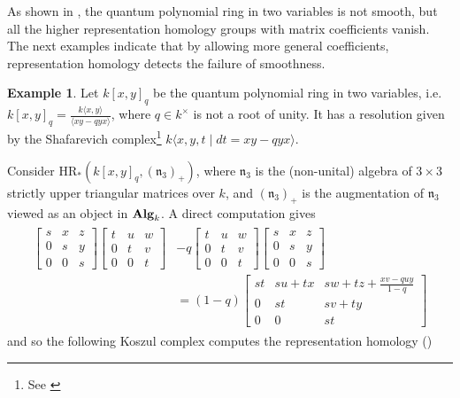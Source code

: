 \documentclass{article}
\numberwithin{equation}{section} %
\theoremstyle{plain}
\theoremstyle{definition}
\newtheorem{example}[theorem]{Example}
\theoremstyle{remark}
\begin{document}
As shown in \cite[Section 6.2.2]{BFR14}, the quantum polynomial ring in two variables is not smooth, but all the higher representation homology groups with matrix coefficients vanish.
The next examples indicate that by allowing more general coefficients, representation homology detects the failure of smoothness.

\begin{example}\label{Example_QuantumPlane}
Let $k[x,y]_q$ be the quantum polynomial ring in two variables, i.e. $\displaystyle k[x,y]_q=\frac{k\langle x,y\rangle}{\langle xy-qyx\rangle}$,
where $q\in k^\times$ is not a root of unity.
It has a resolution given by the Shafarevich complex\footnote{See \cite{P05}} $k\langle x,y,t\mid dt=xy-qyx\rangle$.

Consider $\mathrm{HR}_*(k[x,y]_q,(\mathfrak{n}_3)_+)$, where $\mathfrak{n}_3$ is the (non-unital) algebra of $3\times3$ strictly upper triangular matrices over $k$, and $(\mathfrak{n}_3)_+$ is the augmentation of $\mathfrak{n}_3$ viewed as an object in ${\bf Alg}_k$.
A direct computation gives
\begin{align*}
\begin{split}
\begin{bmatrix}s&x&z\\ 0&s&y\\ 0&0&s\end{bmatrix}\begin{bmatrix}t&u&w\\ 0&t&v\\ 0&0&t\end{bmatrix}&-q\begin{bmatrix}t&u&w\\ 0&t&v\\ 0&0&t\end{bmatrix}\begin{bmatrix}s&x&z\\ 0&s&y\\ 0&0&s\end{bmatrix}\\ &=(1-q)\begin{bmatrix}st&su+tx&sw+tz+\frac{xv-quy}{1-q}\\ 0&st&sv+ty\\ 0&0&st\end{bmatrix}
\end{split}
\end{align*}
and so the following Koszul complex computes the representation homology (\cite[Theorem 2.8]{BKR13})
\begin{equation}\label{Eq_QPlaneKoszul}

\end{equation}
\end{example}
\end{document}
